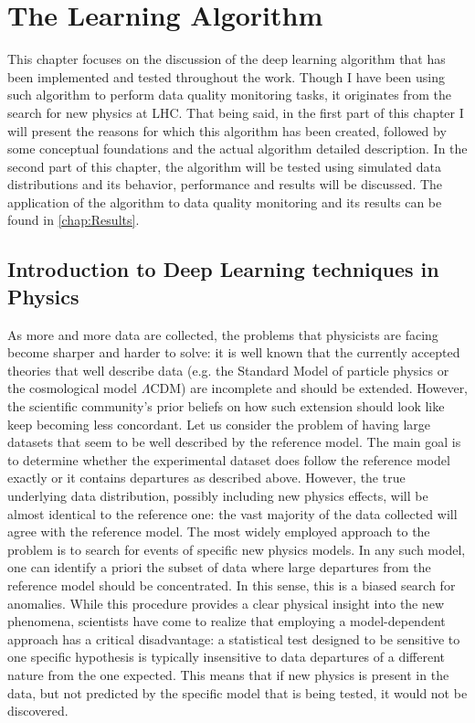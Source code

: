 \chapter{The Learning Algorithm}
\label{chap:Algorithm}

This chapter focuses on the discussion of the deep learning algorithm that has been implemented and tested throughout
the work. Though I have been using such algorithm to perform data quality monitoring tasks, it originates from the
search for new physics at LHC. That being said, in the first part of this chapter I will present the reasons for which
this algorithm has been created, followed by some conceptual foundations and the actual algorithm detailed
description. In the second part of this chapter, the algorithm will be tested using simulated data distributions and its
behavior, performance and results will be discussed. The application of the algorithm to data quality monitoring and
its results can be found in \autoref{chap:Results}.


\section{Introduction to Deep Learning techniques in Physics}
\label{sec:dltphysics}

As more and more data are collected, the problems that physicists are facing become sharper and harder to solve: it is
well known that the currently accepted theories that well describe data (e.g. the Standard Model of particle physics or
the cosmological model $\Lambda$CDM) are incomplete and should be extended. However, the scientific community's prior
beliefs on how such extension should look like keep becoming less concordant. Let us consider the problem of having
large datasets that seem to be well described by the reference model. The main goal is to determine whether the
experimental dataset does follow the reference model exactly or it contains departures as described above. However, the
true underlying data distribution, possibly including new physics effects, will be almost identical to the reference
one: the vast majority of the data collected will agree with the reference model. The most widely employed approach to
the problem is to search for events of specific new physics models. In any such model, one can identify a priori the
subset of data where large departures from the reference model should be concentrated. In this sense, this is a biased
search for anomalies. While this procedure provides a clear physical insight into the new phenomena, scientists have come
to realize that employing a model-dependent approach has a critical disadvantage: a statistical test designed to be
sensitive to one specific hypothesis is typically insensitive to data departures of a different nature from the one
expected. This means that if new physics is present in the data, but not predicted by the specific model that is being
tested, it would not be discovered. 

